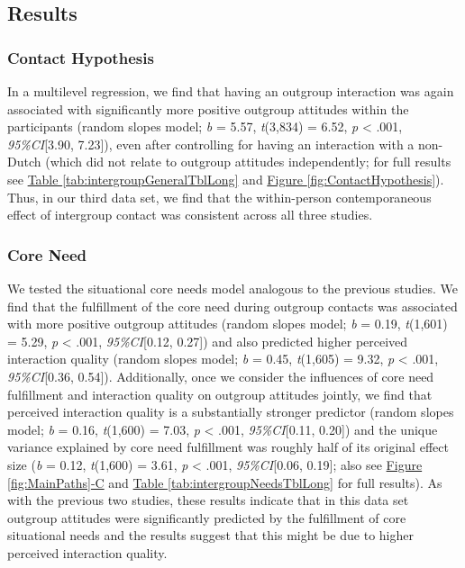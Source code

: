 \documentclass[man, 12pt, a4paper, mask]{apa7}
\theoremstyle{break}
\theoremstyle{plain}
\newcommand{\fgrref}[2][]{\hyperref[#2]{Figure \ref*{#2}#1}}
\newcommand{\tblref}[2][]{\hyperref[#2]{Table \ref*{#2}#1}}
\begin{document}
\subsection{Results}

\subsubsection{Contact Hypothesis}

In a multilevel regression, we find that having an outgroup interaction
was again associated with significantly more positive outgroup attitudes
within the participants (random slopes model; \textit{b} = 5.57,
\textit{t}(3,834) = 6.52, \textit{p} \textless{} .001,
\textit{95\%CI}{[}3.90, 7.23{]}), even after controlling for having an
interaction with a non-Dutch (which did not relate to outgroup attitudes
independently; for full results see
\tblref{tab:intergroupGeneralTblLong} and
\fgrref{fig:ContactHypothesis}). Thus, in our third data set, we find
that the within-person contemporaneous effect of intergroup contact was
consistent across all three studies.

\subsubsection{Core Need}

We tested the situational core needs model analogous to the previous
studies. We find that the fulfillment of the core need during outgroup
contacts was associated with more positive outgroup attitudes (random
slopes model; \textit{b} = 0.19, \textit{t}(1,601) = 5.29, \textit{p}
\textless{} .001, \textit{95\%CI}{[}0.12, 0.27{]}) and also predicted
higher perceived interaction quality (random slopes model; \textit{b} =
0.45, \textit{t}(1,605) = 9.32, \textit{p} \textless{} .001,
\textit{95\%CI}{[}0.36, 0.54{]}). Additionally, once we consider the
influences of core need fulfillment and interaction quality on outgroup
attitudes jointly, we find that perceived interaction quality is a
substantially stronger predictor (random slopes model; \textit{b} =
0.16, \textit{t}(1,600) = 7.03, \textit{p} \textless{} .001,
\textit{95\%CI}{[}0.11, 0.20{]}) and the unique variance explained by
core need fulfillment was roughly half of its original effect size
(\textit{b} = 0.12, \textit{t}(1,600) = 3.61, \textit{p} \textless{}
.001, \textit{95\%CI}{[}0.06, 0.19{]}; also see
\fgrref[-C]{fig:MainPaths} and \tblref{tab:intergroupNeedsTblLong} for
full results). As with the previous two studies, these results indicate
that in this data set outgroup attitudes were significantly predicted by
the fulfillment of core situational needs and the results suggest that
this might be due to higher perceived interaction quality.
\end{document}
